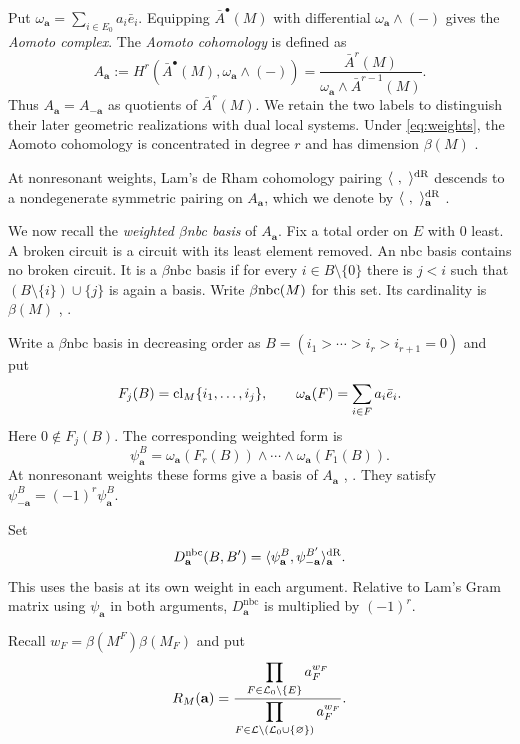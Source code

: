 Put $\omega_{\mathbf a}=\sum_{i\in E_0}a_i\bar e_i$.
Equipping $\bar A^{\bullet}(M)$ with differential
$\omega_{\mathbf a}\wedge(-)$ gives the \emph{Aomoto complex}.
The \emph{Aomoto cohomology} is defined as
\[
 A_{\mathbf a}
 :=H^r(\bar A^{\bullet}(M),\omega_{\mathbf a}\wedge(-))
 =\frac{\bar A^r(M)}{\omega_{\mathbf a}\wedge\bar A^{r-1}(M)}.
\]
Thus $A_{\mathbf a}=A_{-\mathbf a}$ as quotients of $\bar A^r(M)$.
We retain the two labels to distinguish their later geometric
realizations with dual local systems.
Under \eqref{eq:weights}, the Aomoto cohomology is concentrated in
degree $r$ and has dimension $\beta(M)$ \cite[Theorem 7.3]{Lam}.

At nonresonant weights, Lam's de Rham cohomology pairing $\langle~,~\rangle^{\mathrm{dR}}$ descends to a nondegenerate symmetric pairing on $A_{\mathbf a}$, which we denote by $\langle~,~\rangle^{\mathrm{dR}}_{\mathbf a}$ 
\cite[Theorem 7.7 and Corollary 7.15]{Lam}.

We now recall the \textit{weighted $\beta$nbc basis} of $A_{\mathbf a}$. Fix a total order on $E$ with $0$ least.
A broken circuit is a circuit
with its least element removed. An nbc basis contains no broken
circuit. It is a $\beta$nbc basis if for every $i\in B\setminus\{0\}$
there is $j<i$ such that $(B\setminus\{i\})\cup\{j\}$ is again a
basis. Write $\beta\mathrm{nbc}(M)$ for this set. Its cardinality is $\beta(M)$
\cite{Ziegler1992}, \cite[Definition 7.9 and Theorem 7.10]{Lam}.

Write a $\beta$nbc basis in decreasing order as
$B=(i_1>\cdots>i_r>i_{r+1}=0)$ and put
\[
 F_j(B)=\operatorname{cl}_M\{i_1,\ldots,i_j\},\qquad
 \omega_{\mathbf a}(F)=\sum_{i\in F}a_i\bar e_i.
\]
Here $0\notin F_j(B)$. The corresponding weighted form is
\begin{equation}\label{eq:nbc-form}
 \psi_{\mathbf a}^B
 =\omega_{\mathbf a}(F_r(B))\wedge\cdots\wedge
   \omega_{\mathbf a}(F_1(B)).
\end{equation}
At nonresonant weights these forms give a basis of $A_{\mathbf a}$
\cite{FalkTerao1997}, \cite[Corollary 7.14]{Lam}.
They satisfy $\psi_{-\mathbf a}^B=(-1)^r\psi_{\mathbf a}^B$.

Set
\[
 D_{\mathbf a}^{\mathrm{nbc}}(B,B')
   =\langle\psi_{\mathbf a}^B,\psi_{-\mathbf a}^{B'}\rangle^{\mathrm{dR}}_{\mathbf a}.
\]
This uses the basis at its own weight in each argument. Relative
to Lam's Gram matrix using $\psi_{\mathbf a}$ in both arguments,
$D_{\mathbf a}^{\mathrm{nbc}}$ is multiplied by $(-1)^r$.

Recall $w_F=\beta(M^F)\beta(M_F)$ and put
\[
 R_M(\mathbf a)
 =\frac{\displaystyle\prod_{F\in\mathcal L_0\setminus\{E\}}a_F^{w_F}}
        {\displaystyle\prod_{F\in\mathcal L\setminus(\mathcal L_0\cup\{\varnothing\})}
             a_F^{w_F}}.
\]

